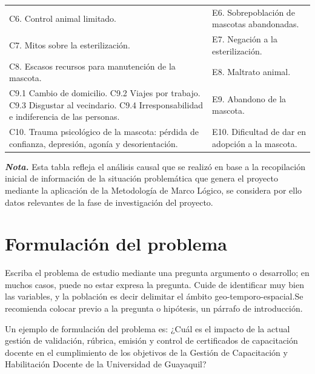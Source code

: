 \documentclass[12pt, a4paper, nofontenc, numbers=endperiod]{apa7}
\begin{document}
{\begin{table}[h]
{\begin{tabular}{p{6cm}p{9.1cm}}
				C6. Control animal limitado. &  E6. Sobrepoblación de mascotas abandonadas. \\
				
				C7. Mitos sobre la esterilización. &  E7. Negación a la esterilización. \\
				
				C8. Escasos recursos para manutención de la mascota. &  E8. Maltrato animal. \\
				
				C9.1 Cambio de domicilio. \newline
				C9.2 Viajes por trabajo. \newline
				C9.3 Disgustar al vecindario.  \newline
				C9.4 Irresponsabilidad e indiferencia de las personas.
				&  E9. Abandono de la mascota. \\
				
				C10. Trauma psicológico de la mascota: pérdida de confianza, depresión, agonía y desorientación. &  E10. Dificultad de dar en adopción a la mascota. \\
				\midrule
			\end{tabular}
		
			\begin{tablenotes}[para,flushleft]
			{\small
				\textit{\textbf{Nota.}} Esta tabla refleja el análisis causal que se realizó en base a la recopilación inicial de información de la situación problemática que genera el proyecto mediante la aplicación de la Metodología de Marco Lógico, se considera por ello datos relevantes de la fase de investigación del proyecto.
			}
		\end{tablenotes}
		}
	\end{table}
	
	\newpage 
	
	\section{\normalsize \centering Formulación del problema}
	
	\setlength{\parindent}{1.27cm}Escriba el problema de estudio mediante una pregunta argumento o desarrollo; en muchos casos, puede no estar expresa la pregunta. Cuide de identificar muy bien las variables, y la población es decir delimitar el ámbito geo-temporo-espacial.Se recomienda colocar previo a la pregunta o hipótesis, un párrafo de introducción.
	
	\setlength{\parindent}{1.27cm}Un ejemplo de formulación del problema es: ¿Cuál es el impacto de la actual gestión de validación, rúbrica, emisión y control de certificados de capacitación docente en el cumplimiento de los objetivos de la Gestión de Capacitación y Habilitación Docente de la Universidad de Guayaquil?
	
}
\end{document}
